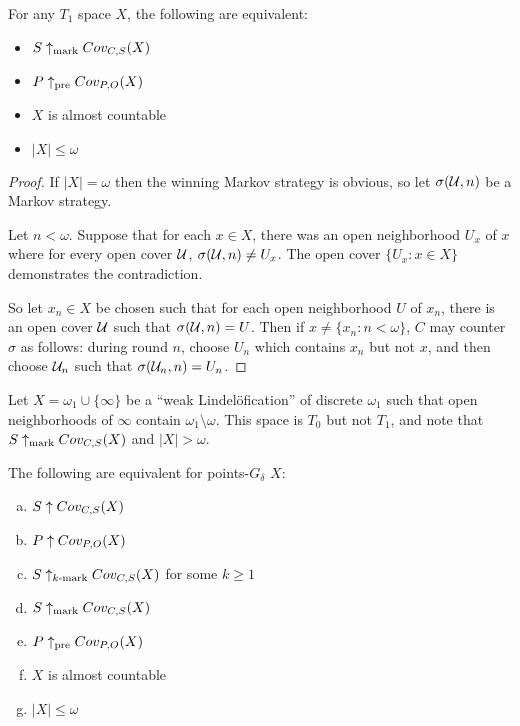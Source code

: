   \begin{theorem}
    For any $T_1$ space $X$, the following are equivalent:
    \begin{itemize}
      \item $S\uparrow_{\text{mark}}Cov_{C,S}(X)$
      \item $P\uparrow_{\text{pre}}Cov_{P,O}(X)$
      \item $X$ is almost countable
      \item $|X|\leq\omega$
    \end{itemize}
  \end{theorem}

  \begin{proof}
    If $|X|=\omega$ then the winning Markov strategy is obvious, so let $\sigma(\mathcal{U},n)$ be a Markov strategy.

    Let $n<\omega$. Suppose that for each $x\in X$, there was an open neighborhood $U_x$ of $x$ where for every open cover $\mathcal{U}$, $\sigma(\mathcal{U},n) \not= U_x$. The open cover $\{U_x : x\in X\}$ demonstrates the contradiction.

    So let $x_n\in X$ be chosen such that for each open neighborhood $U$ of $x_n$, there is an open cover $\mathcal{U}$ such that $\sigma(\mathcal{U},n)=U$. Then if $x\not=\{x_n : n<\omega\}$, $C$ may counter $\sigma$ as follows: during round $n$, choose $U_n$ which contains $x_n$ but not $x$, and then choose $\mathcal{U}_n$ such that $\sigma(\mathcal{U}_n,n)=U_n$.
  \end{proof}

  \begin{example}
    Let $X=\omega_1\cup\{\infty\}$ be a ``weak Lindel\"ofication'' of discrete $\omega_1$ such that open neighborhoods of $\infty$ contain $\omega_1\setminus\omega$. This space is $T_0$ but not $T_1$, and note that $S\uparrow_{\text{mark}}Cov_{C,S}(X)$ and $|X|>\omega$.
  \end{example}

  \begin{theorem}
    The following are equivalent for points-$G_\delta$ $X$:
      \begin{enumerate}[(a)]
        \item $S\uparrow Cov_{C,S}(X)$
        \item $P\uparrow Cov_{P,O}(X)$
        \item $S\uparrow_{k\text{-mark}}Cov_{C,S}(X)$ for some $k\geq 1$
        \item $S\uparrow_{\text{mark}}Cov_{C,S}(X)$
        \item $P\uparrow_{\text{pre}}Cov_{P,O}(X)$
        \item $X$ is almost countable
        \item $|X|\leq\omega$
      \end{enumerate}
  \end{theorem}

